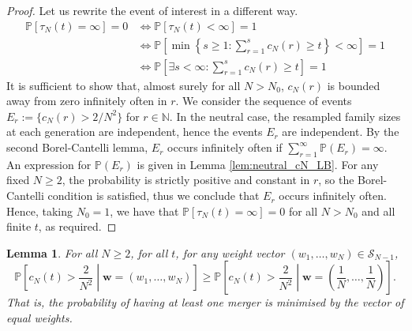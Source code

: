 \documentclass{article}
\newtheorem{lemma}{Lemma}
\newcommand{\PR}{\mathbb{P}}
\newcommand{\1}[1]{\mathbb{I}_{#1}}
\begin{document}
\begin{proof}
Let us rewrite the event of interest in a different way.
\begin{align*}
\PR[\tau_N(t) = \infty] =0 &\Leftrightarrow \PR[\tau_N(t) < \infty] =1 \\
&\Leftrightarrow \PR\left[ \min \left\{s \geq 1 : \sum_{r=1}^s c_N(r) \geq t \right\} < \infty \right] =1 \\
&\Leftrightarrow \PR\left[ \exists s<\infty : \sum_{r=1}^s c_N(r) \geq t \right] =1
\end{align*}
It is sufficient to show that, almost surely for all $N>N_0$, $c_N(r)$ is bounded away from zero infinitely often in $r$.
We consider the sequence of events 
$E_r := \{ c_N(r) > 2/N^2 \}$ for $r \in \mathbb{N}$.
In the neutral case, the resampled family sizes at each generation are independent, hence the events $E_r$ are independent. 
By the second Borel-Cantelli lemma, $E_r$ occurs infinitely often if $\sum_{r=1}^\infty \PR(E_r) = \infty$. 
An expression for $\PR(E_r)$ is given in Lemma \ref{lem:neutral_cN_LB}. 
For any fixed $N\geq 2$, the probability is strictly positive and constant in $r$, so the Borel-Cantelli condition is satisfied, thus we conclude that $E_r$ occurs infinitely often.
Hence, taking $N_0=1$, we have that $\PR[\tau_N(t) = \infty] =0$ for all $N>N_0$ and all finite $t$, as required.
\end{proof}


\begin{lemma}\label{lem:mn_optimal_w}
For all $N\geq 2$, for all $t$, for any weight vector $(w_1, \dots, w_N) \in \mathcal{S}_{N-1}$,
\begin{equation*}
\PR \left[c_N(t) > \frac{2}{N^2} \middle| \mathbf{w}=(w_1, \dots, w_N) \right]
\geq \PR \left[c_N(t) > \frac{2}{N^2} \middle| \mathbf{w}=\left( \frac{1}{N}, \dots, \frac{1}{N} \right) \right] .
\end{equation*}
That is, the probability of having at least one merger is minimised by the vector of equal weights.
\end{lemma}
\end{document}
